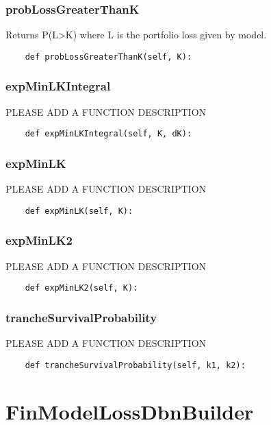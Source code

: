 \documentclass[twoside,11pt]{book}
\begin{document}
\subsubsection*{{\bf probLossGreaterThanK}}
Returns P(L>K) where L is the portfolio loss given by model.  

\begin{lstlisting}
    def probLossGreaterThanK(self, K):
\end{lstlisting}

\subsubsection*{{\bf expMinLKIntegral}}
PLEASE ADD A FUNCTION DESCRIPTION

\begin{lstlisting}
    def expMinLKIntegral(self, K, dK):
\end{lstlisting}

\subsubsection*{{\bf expMinLK}}
PLEASE ADD A FUNCTION DESCRIPTION

\begin{lstlisting}
    def expMinLK(self, K):
\end{lstlisting}

\subsubsection*{{\bf expMinLK2}}
PLEASE ADD A FUNCTION DESCRIPTION

\begin{lstlisting}
    def expMinLK2(self, K):
\end{lstlisting}

\subsubsection*{{\bf trancheSurvivalProbability}}
PLEASE ADD A FUNCTION DESCRIPTION

\begin{lstlisting}
    def trancheSurvivalProbability(self, k1, k2):
\end{lstlisting}

\newpage
\section{FinModelLossDbnBuilder}
\end{document}
